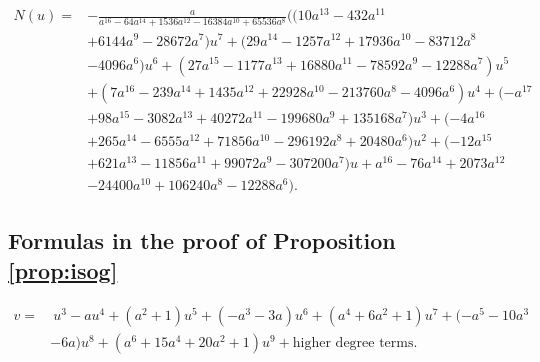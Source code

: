 \documentclass{gtpart}
\theoremstyle{definition}
\theoremstyle{remark}
\begin{document}
\begin{equation*}
\begin{split}
 N(u) = & - \frac{a}{a^{16} - 64 a^{14} + 1536 a^{12} - 16384 a^{10} + 65536 a^8} \big( (10 a^{13} - 432 a^{11} \\
        & + 6144 a^9 - 28672 a^7) u^7 + (29 a^{14} - 1257 a^{12} + 17936 a^{10} - 83712 a^8 \\
        & - 4096 a^6) u^6 + (27 a^{15} - 1177 a^{13} + 16880 a^{11} - 78592 a^9 - 12288 a^7) u^5 \\
        & + (7 a^{16} - 239 a^{14} + 1435 a^{12} + 22928 a^{10} - 213760 a^8 - 4096 a^6) u^4 + (-a^{17} \\
        & + 98 a^{15} - 3082 a^{13} + 40272 a^{11} - 199680 a^9 + 135168 a^7) u^3 + (-4 a^{16} \\
        & + 265 a^{14} - 6555 a^{12} + 71856 a^{10} - 296192 a^8 + 20480 a^6) u^2 + (-12 a^{15} \\
        & + 621 a^{13} - 11856 a^{11} + 99072 a^9 - 307200 a^7) u + a^{16} - 76 a^{14} + 2073 a^{12} \\
        & - 24400 a^{10} + 106240 a^8 - 12288 a^6 \big).  
\end{split}
\end{equation*}


\subsection{Formulas in the proof of Proposition \ref{prop:isog}}
\label{apx:isog}

\begin{equation*}
\begin{split}
 v = & ~ u^3 - a u^4 + (a^2 + 1) u^5 + (-a^3 - 3 a) u^6 + (a^4 + 6 a^2 + 1) u^7 + (-a^5 - 10 a^3 \\
     & - 6 a) u^8 + (a^6 + 15 a^4 + 20 a^2 + 1) u^9 + \text{higher degree terms}.  
\end{split}
\end{equation*}
\end{document}
